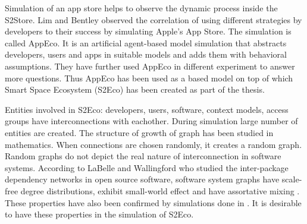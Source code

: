 Simulation of an app store helps to observe the dynamic process inside the S2Store. Lim and Bentley \cite{lim2012successful} observed the correlation of using different strategies by developers to their success by simulating Apple's App Store. The simulation is called AppEco. It is an artificial agent-based model simulation that abstracts developers, users and apps in suitable models and adds them with behavioral assumptions. They have further used AppEco in different experiment to answer more questions. Thus AppEco has been used as a based model on top of which Smart Space Ecosystem (S2Eco) has been created as part of the thesis.

Entities involved in S2Eco: developers, users, software, context models, access groups have interconnections with eachother. During simulation large number of entities are created. The structure of growth of graph has been studied in mathematics. When connections are chosen randomly, it creates a random graph. Random graphs do not depict the real nature of interconnection in software systems. According to LaBelle and Wallingford \cite{labelle2004inter} who studied the inter-package dependency networks in open source software, software system graphs have scale-free degree distributions, exhibit small-world effect and have assortative mixing \cite{newman2002assortative}. These properties have also been confirmed by simulations done in \cite{myers2003software}. It is desirable to have these properties in the simulation of S2Eco.

